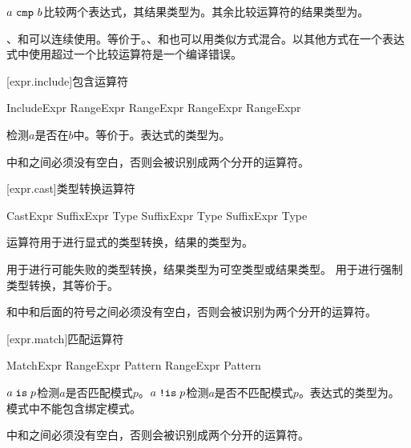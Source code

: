 \pnum
$a\ \tcode{cmp}\ b$比较两个表达式，其结果类型为。其余比较运算符的结果类型为。

\pnum
\tcode{<}、\tcode{<=}和\tcode{==}可以连续使用。等价于。\tcode{>}、\tcode{>=}和\tcode{==}也可以用类似方式混合。以其他方式在一个表达式中使用超过一个比较运算符是一个编译错误。

[expr.include]{包含运算符}

\begin{bnf}{IncludeExpr}
    RangeExpr  RangeExpr \br
    RangeExpr  RangeExpr
\end{bnf}

\pnum
{}检测$a$是否在$b$中。等价于。表达式的类型为。

\pnum
\enternote {}中\tcode{!}和之间必须没有空白，否则会被识别成两个分开的运算符。\exitnote

[expr.cast]{类型转换运算符}

\begin{bnf}{CastExpr}
    SuffixExpr  Type \br
    SuffixExpr  Type \br
    SuffixExpr  Type
\end{bnf}

\pnum
{}运算符用于进行显式的类型转换，结果的类型为。

\pnum
{}用于进行可能失败的类型转换，结果类型为可空类型或结果类型。
用于进行强制类型转换，其等价于。

\pnum
\enternote {}和中和后面的符号之间必须没有空白，否则会被识别为两个分开的运算符。\exitnote

[expr.match]{匹配运算符}

\begin{bnf}{MatchExpr}
    RangeExpr  Pattern \br
    RangeExpr  Pattern
\end{bnf}

\pnum
$a \mathrel{\texttt{is}} p$检测$a$是否匹配模式$p$。$a \mathrel{\texttt{!is}} p$检测$a$是否不匹配模式$p$。表达式的类型为。模式中不能包含绑定模式。

\pnum
\enternote {}中\tcode{!}和之间必须没有空白，否则会被识别成两个分开的运算符。\exitnote

